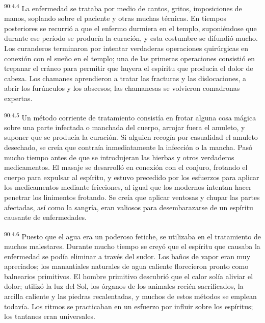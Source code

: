 \par
\textsuperscript{90:4.4} La enfermedad se trataba por medio de cantos, gritos, imposiciones de manos, soplando sobre el paciente y otras muchas técnicas. En tiempos posteriores se recurrió a que el enfermo durmiera en el templo, suponiéndose que durante ese período se producía la curación, y esta costumbre se difundió mucho. Los curanderos terminaron por intentar verdaderas operaciones quirúrgicas en conexión con el sueño en el templo; una de las primeras operaciones consistió en trepanar el cráneo para permitir que huyera el espíritu que producía el dolor de cabeza. Los chamanes aprendieron a tratar las fracturas y las dislocaciones, a abrir los furúnculos y los abscesos; las chamanesas se volvieron comadronas expertas.

\par
\textsuperscript{90:4.5} Un método corriente de tratamiento consistía en frotar alguna cosa mágica sobre una parte infectada o manchada del cuerpo, arrojar fuera el amuleto, y suponer que se producía la curación. Si alguien recogía por casualidad el amuleto desechado, se creía que contraía inmediatamente la infección o la mancha. Pasó mucho tiempo antes de que se introdujeran las hierbas y otros verdaderos medicamentos. El masaje se desarrolló en conexión con el conjuro, frotando el cuerpo para expulsar al espíritu, y estuvo precedido por los esfuerzos para aplicar los medicamentos mediante fricciones, al igual que los modernos intentan hacer penetrar los linimentos frotando. Se creía que aplicar ventosas y chupar las partes afectadas, así como la sangría, eran valiosos para desembarazarse de un espíritu causante de enfermedades.

\par
\textsuperscript{90:4.6} Puesto que el agua era un poderoso fetiche, se utilizaba en el tratamiento de muchos malestares. Durante mucho tiempo se creyó que el espíritu que causaba la enfermedad se podía eliminar a través del sudor. Los baños de vapor eran muy apreciados; los manantiales naturales de agua caliente florecieron pronto como balnearios primitivos. El hombre primitivo descubrió que el calor solía aliviar el dolor; utilizó la luz del Sol, los órganos de los animales recién sacrificados, la arcilla caliente y las piedras recalentadas, y muchos de estos métodos se emplean todavía. Los ritmos se practicaban en un esfuerzo por influir sobre los espíritus; los tantanes eran universales.

